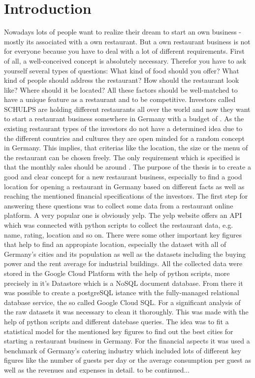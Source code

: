 \section{Introduction}
\label{sec:introduction}
Nowadays lots of people want to realize their dream to start an own business - mostly its associated with a own restaurant. But a own restaurant business is not for everyone because you have to deal with a lot of different requirements. First of all, a well-conceived concept is absolutely necessary. Therefor you have to ask yourself several types of questions: What kind of food should you offer? What kind of people should address the restaurant? How should the restaurant look like? Where should it be located? All these factors should be well-matched to have a unique feature as a restaurant and to be competitive.
Investors called SCHULPS are holding different restaurants all over the world and now they want to start a restaurant business somewhere in Germany with a budget of .  As the existing restaurant types of the investors do not have a determined idea due to the different countries and cultures they are open minded for a random concept in Germany. This implies, that criterias like the location, the size or the menu of the restaurant can be chosen freely. The only requirement which is specified is that the monthly sales should be around . The purpose of the thesis is to create a good and clear concept for a new restaurant business, especially to find a good location for opening a restaurant in Germany based on different facts as well as reaching the mentioned financial specifications of the investors. 
The first step for answering these questions was to collect some data from a restaurant online platform. A very popular one is obviously yelp. The yelp website offers an API which was connected with python scripts to collect the restaurant data, e.g. name, rating, location and so on. There were some other important key figures that help to find an appropiate location, especially the dataset with all of Germany's cities and its population as well as the datasets including the buying power and the rent average for industrial buildings. All the collected data were stored in the Google Cloud Platform with the help of python scripts, more precisely in it's Datastore which is a NoSQL document database. From there it was possible to create a postgreSQL istance with the fully-managed relational database service, the so called Google Cloud SQL. For a significant analysis of the raw datasets it was necessary to clean it thoroughly. This was made with the help of python scripts and different datebase queries. The idea was to fit a statistical model for the mentioned key figures to find out the best cities for starting a restaurant business in Germany. For the financial aspects it was used a benchmark of Germany's catering industry which included lots of different key figures like the number of guests per day or the average consumption per guest as well as the revenues and expenses in detail. 
to be continued...

